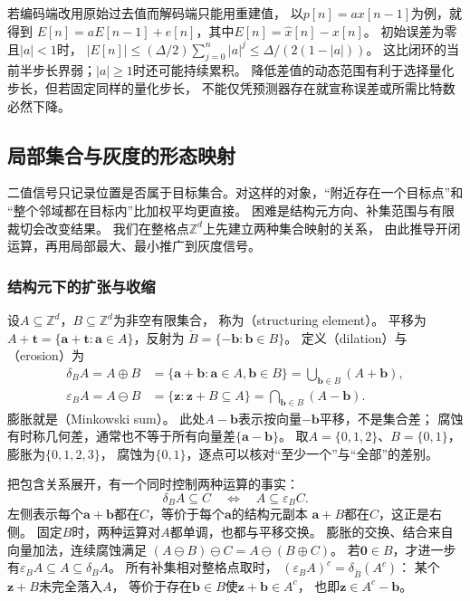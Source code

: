 若编码端改用原始过去值而解码端只能用重建值，
以$p[n]=a x[n-1]$为例，就得到
$E[n]=aE[n-1]+e[n]$，其中$E[n]=\widehat x[n]-x[n]$。
初始误差为零且$|a|<1$时，
$|E[n]|\leq(\Delta/2)\sum_{j=0}^n|a|^j
\leq\Delta/(2(1-|a|))$。
这比闭环的当前半步长界弱；$|a|\geq1$时还可能持续累积。
降低差值的动态范围有利于选择量化步长，但若固定同样的量化步长，
不能仅凭预测器存在就宣称误差或所需比特数必然下降。

\subsection{局部集合与灰度的形态映射}
\label{sec:signal-morphological-maps}

二值信号只记录位置是否属于目标集合。对这样的对象，“附近存在一个目标点”和
“整个邻域都在目标内”比加权平均更直接。
困难是结构元方向、补集范围与有限裁切会改变结果。
我们在整格点$\mathbb Z^d$上先建立两种集合映射的关系，
由此推导开闭运算，再用局部最大、最小推广到灰度信号。

\subsubsection{结构元下的扩张与收缩}
设$A\subseteq\mathbb Z^d$，$B\subseteq\mathbb Z^d$为非空有限集合，
称为（structuring element）。
平移为$A+\bm t=\{\bm a+\bm t:\bm a\in A\}$，反射为
$\check B=\{-\bm b:\bm b\in B\}$。
定义（dilation）与（erosion）为
\begin{equation}
 \begin{aligned}
 \delta_B A=A\oplus B
 &=\{\bm a+\bm b:\bm a\in A,\bm b\in B\}
   =\bigcup_{\bm b\in B}(A+\bm b),\\
 \varepsilon_B A=A\ominus B
 &=\{\bm z:\bm z+B\subseteq A\}
   =\bigcap_{\bm b\in B}(A-\bm b).
 \end{aligned}
 \label{eq:signal-minkowski-morphology}
\end{equation}
膨胀就是（Minkowski sum）。
此处$A-\bm b$表示按向量$-\bm b$平移，不是集合差；
腐蚀有时称几何差，通常也不等于所有向量差$\{\bm a-\bm b\}$。
取$A=\{0,1,2\}$、$B=\{0,1\}$，膨胀为$\{0,1,2,3\}$，
腐蚀为$\{0,1\}$，逐点可以核对“至少一个”与“全部”的差别。

把包含关系展开，有一个同时控制两种运算的事实：
\begin{equation}
 \delta_B A\subseteq C
 \quad\Longleftrightarrow\quad A\subseteq\varepsilon_B C.
 \label{eq:signal-morphology-adjunction}
\end{equation}
左侧表示每个$\bm a+\bm b$都在$C$，等价于每个$\bm a$的结构元副本
$\bm a+B$都在$C$，这正是右侧。
固定$B$时，两种运算对$A$都单调，也都与平移交换。
膨胀的交换、结合来自向量加法，连续腐蚀满足
$(A\ominus B)\ominus C=A\ominus(B\oplus C)$。
若$\bm0\in B$，才进一步有$\varepsilon_B A\subseteq A\subseteq\delta_B A$。
所有补集相对整格点取时，
$(\varepsilon_B A)^c=\delta_{\check B}(A^c)$：
某个$\bm z+B$未完全落入$A$，
等价于存在$\bm b\in B$使$\bm z+\bm b\in A^c$，
也即$\bm z\in A^c-\bm b$。

